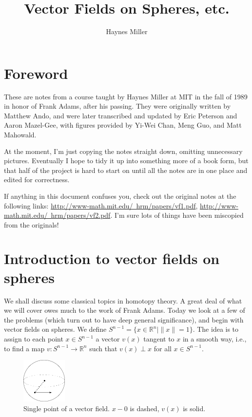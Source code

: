 \documentclass{article}
\title{Vector Fields on Spheres, etc.}
\author{Haynes Miller}
\newcommand{\OutputFrontMatter}{}
\newcommand{\OutputForeword}{}
\newcommand{\OutputIntroductionToVectorFieldsOnSpheres}{}
\newcommand{\R}{\mathbb{R}}
\begin{document}
\ifx\OutputFrontMatter\undefined\else
\maketitle
\tableofcontents
\fi

\section{Foreword} %
\ifx\OutputForeword\undefined\else
These are notes from a course taught by Haynes Miller at MIT in the fall of 1989 in honor of Frank Adams, after his passing.  They were originally written by Matthew Ando, and were later transcribed and updated by Eric Peterson and Aaron Mazel-Gee, with figures provided by Yi-Wei Chan, Meng Guo, and Matt Mahowald.

At the moment, I'm just copying the notes straight down, omitting unnecessary pictures.  Eventually I hope to tidy it up into something more of a book form, but that half of the project is hard to start on until all the notes are in one place and edited for correctness.

If anything in this document confuses you, check out the original notes at the following links: \href{http://www-math.mit.edu/~hrm/papers/vf1.pdf}{http://www-math.mit.edu/~hrm/papers/vf1.pdf}, \href{http://www-math.mit.edu/~hrm/papers/vf2.pdf}{http://www-math.mit.edu/~hrm/papers/vf2.pdf}.  I'm sure lots of things have been miscopied from the originals!

\fi
\section{Introduction to vector fields on spheres} %
\ifx\OutputIntroductionToVectorFieldsOnSpheres\undefined\else

We shall discuss some classical topics in homotopy theory.  A great deal of what we will cover owes much to the work of Frank Adams.  Today we look at a few of the problems (which turn out to have deep general significance), and begin with vector fields on spheres.  We define $S^{n-1} = \{x \in \R^n \mid \|x\| = 1\}$.  The idea is to assign to each point $x \in S^{n-1}$ a vector $v(x)$ tangent to $x$ in a smooth way, i.e., to find a map $v: S^{n-1} \to \R^n$ such that $v(x) \perp x$ for all $x \in S^{n-1}$.

\begin{figure}
\centering\includegraphics[width=0.2\textwidth]{figures/fig1.pdf}
\caption{\small Single point of a vector field. $x - 0$ is dashed, $v(x)$ is solid.}
\end{figure}
\end{document}
